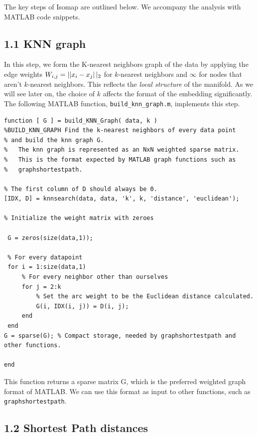 \documentclass[a4paper,12pt]{report}
\begin{document}
The key steps of Isomap are outlined below. We accompany the analysis with MATLAB code snippets.

\subsection*{1.1  KNN graph}

In this step, we form the K-nearest neighbors graph of the data by applying the edge weights $W_{i,j} = \left || x_i - x_j \right ||_{\scriptsize{2}}$ for $k$-nearest neighbors and $\infty$ for nodes that aren't $k$-nearest neighbors. This reflects the \textit{local structure} of the manifold. As we will see later on, the choice of $k$ affects the format of the embedding significantly. The following MATLAB function, \texttt{build\_knn\_graph.m}, implements this step.

\vspace{.2in}

\begin{lstlisting} 
function [ G ] = build_KNN_Graph( data, k )
%BUILD_KNN_GRAPH Find the k-nearest neighbors of every data point 
% and build the knn graph G.
%   The knn graph is represented as an NxN weighted sparse matrix.
%   This is the format expected by MATLAB graph functions such as
%   graphshortestpath.

% The first column of D should always be 0.
[IDX, D] = knnsearch(data, data, 'k', k, 'distance', 'euclidean');

% Initialize the weight matrix with zeroes

 G = zeros(size(data,1)); 
 
 % For every datapoint
 for i = 1:size(data,1)
     % For every neighbor other than ourselves
     for j = 2:k
         % Set the arc weight to be the Euclidean distance calculated.
         G(i, IDX(i, j)) = D(i, j);
     end
 end
G = sparse(G); % Compact storage, needed by graphshortestpath and other functions.

end
\end{lstlisting}

This function returns a sparse matrix G, which is the preferred weighted graph format of MATLAB. We can use this format as input to other functions,
such as \texttt{graphshortestpath}.

\subsection*{1.2 Shortest Path distances} 
\end{document}
